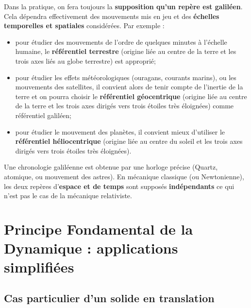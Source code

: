 \documentclass[10pt,fleqn]{article} %
\begin{document}
\begin{rem}
Dans la pratique, on fera toujours la \textbf{supposition qu'un repère est galiléen}. Cela dépendra effectivement des mouvements mis en jeu et des \textbf{échelles temporelles et spatiales} considérées. 
Par exemple :
\begin{itemize}
\item pour étudier des mouvements de l'ordre de quelques minutes à l'échelle humaine, le \textbf{référentiel terrestre} (origine liée au centre de la terre et les trois axes liés au globe terrestre) est approprié;
\item pour étudier les effets météorologiques (ouragans, courants marins), ou les mouvements des satellites, il convient alors de tenir compte de l'inertie de la terre et on pourra choisir le \textbf{référentiel géocentrique} (origine liée au centre de la terre et les trois axes dirigés vers trois étoiles très éloignées) comme référentiel galiléen;
\item pour étudier le mouvement des planètes, il convient mieux d'utiliser le \textbf{référentiel héliocentrique} (origine liée au centre du soleil et les trois axes dirigés vers trois étoiles très éloignées).
\end{itemize}

Une chronologie galiléenne est obtenue par une horloge précise (Quartz, atomique, ou mouvement des astres).
En mécanique classique (ou Newtonienne), les deux repères d'\textbf{espace et de temps} sont supposés \textbf{indépendants} ce qui n'est pas le cas de la mécanique relativiste. 
\end{rem}




\section{Principe Fondamental de la Dynamique : applications simplifiées}

\subsection{Cas particulier d'un solide en translation}
\end{document}
